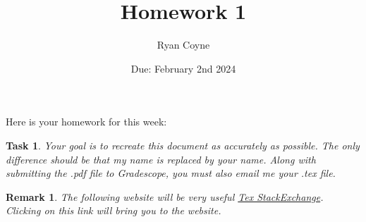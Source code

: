 \documentclass{article}
\title{Homework 1}
\author{Ryan Coyne}
\date{Due: February 2nd 2024}
\newtheorem{task}{Task}
\newtheorem{remark}{Remark}
\begin{document}
    \maketitle
    Here is your homework for this week:
    \begin{task}
        Your goal is to recreate this document as accurately as possible. The only difference should be that my name is replaced by your name. Along with submitting the .pdf file to Gradescope, you must also email me your .tex file.
    \end{task}
    \begin{remark}
        The following website will be very useful \href{https://tex.stackexchange.com/}{Tex StackExchange}. Clicking on this link will bring you to the website.
    \end{remark}
\end{document}
